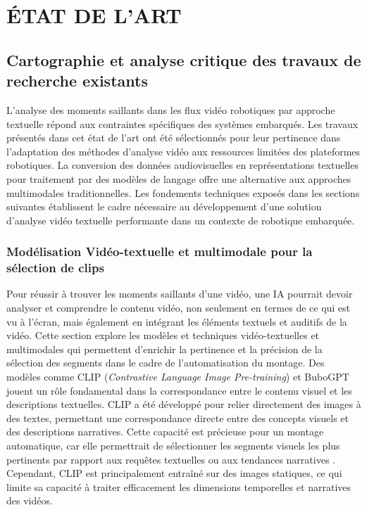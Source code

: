 \chapter{ÉTAT DE L'ART}

\section{Cartographie et analyse critique des travaux de recherche existants}
L'analyse des moments saillants dans les flux vidéo robotiques par approche textuelle répond aux contraintes spécifiques des systèmes embarqués. Les travaux présentés dans cet état de l'art ont été sélectionnés pour leur pertinence dans l'adaptation des méthodes d'analyse vidéo aux ressources limitées des plateformes robotiques. La conversion des données audiovisuelles en représentations textuelles pour traitement par des modèles de langage offre une alternative aux approches multimodales traditionnelles. Les fondements techniques exposés dans les sections suivantes établissent le cadre nécessaire au développement d'une solution d'analyse vidéo textuelle performante dans un contexte de robotique embarquée.

\subsection{Modélisation Vidéo-textuelle et multimodale pour la sélection de clips}
Pour réussir à trouver les moments saillants d’une vidéo, une IA pourrait devoir analyser et comprendre le contenu vidéo, non seulement en termes de ce qui est vu à l’écran, mais également en intégrant les éléments textuels et auditifs de la vidéo. Cette section explore les modèles et techniques vidéo-textuelles et multimodales qui permettent d’enrichir la pertinence et la précision de la sélection des segments dans le cadre de l’automatisation du montage. Des modèles comme CLIP \cite{bain2022}\cite{anonymous2023_bubogpt} (\textit{Contrastive Language Image Pre-training}) et BuboGPT \cite{feng2023}\cite{munasinghe2023_pgvideo} jouent un rôle fondamental dans la correspondance entre le contenu visuel et les descriptions textuelles. CLIP a été développé pour relier directement des images à des textes, permettant une correspondance directe entre des concepts visuels et des descriptions narratives. Cette capacité est précieuse pour un montage automatique, car elle permettrait de sélectionner les segments visuels les plus pertinents par rapport aux requêtes textuelles ou aux tendances narratives \cite{chen2023}\cite{ghosh2019_excl}. Cependant, CLIP est principalement entraîné sur des images statiques, ce qui limite sa capacité à traiter efficacement les dimensions temporelles et narratives des vidéos.


